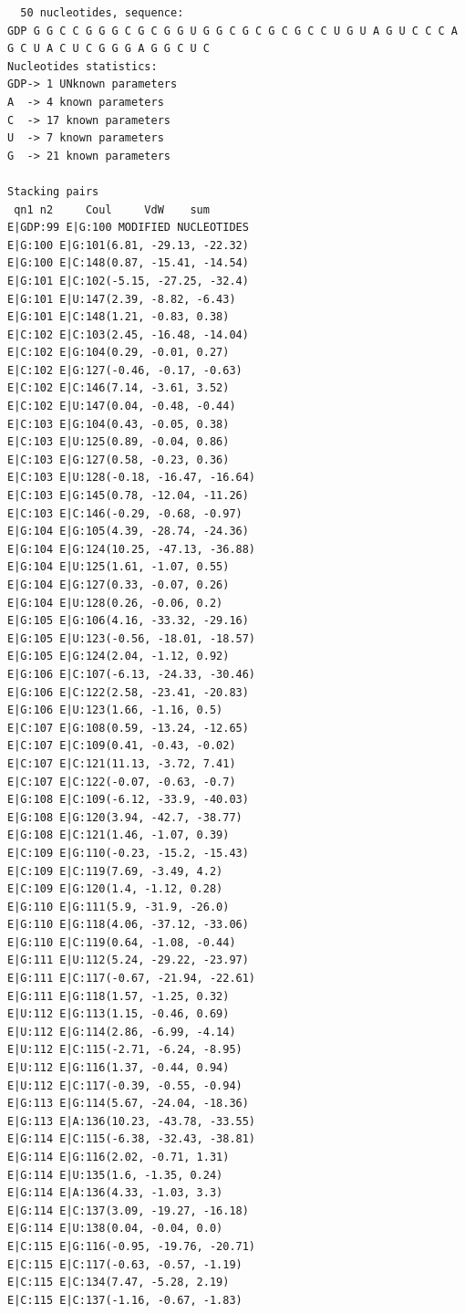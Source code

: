 \documentclass[12pt]{article}
\begin{document}
\begin{appendices}
\begin{scriptsize}
\begin{lstlisting}
  50 nucleotides, sequence: 
GDP G G C C G G G C G C G G U G G C G C G C G C C U G U A G U C C C A G C U A C U C G G G A G G C U C 
Nucleotides statistics:
GDP-> 1 UNknown parameters
A  -> 4 known parameters
C  -> 17 known parameters
U  -> 7 known parameters
G  -> 21 known parameters

Stacking pairs
 qn1 n2     Coul     VdW    sum
E|GDP:99 E|G:100 MODIFIED NUCLEOTIDES
E|G:100 E|G:101(6.81, -29.13, -22.32)
E|G:100 E|C:148(0.87, -15.41, -14.54)
E|G:101 E|C:102(-5.15, -27.25, -32.4)
E|G:101 E|U:147(2.39, -8.82, -6.43)
E|G:101 E|C:148(1.21, -0.83, 0.38)
E|C:102 E|C:103(2.45, -16.48, -14.04)
E|C:102 E|G:104(0.29, -0.01, 0.27)
E|C:102 E|G:127(-0.46, -0.17, -0.63)
E|C:102 E|C:146(7.14, -3.61, 3.52)
E|C:102 E|U:147(0.04, -0.48, -0.44)
E|C:103 E|G:104(0.43, -0.05, 0.38)
E|C:103 E|U:125(0.89, -0.04, 0.86)
E|C:103 E|G:127(0.58, -0.23, 0.36)
E|C:103 E|U:128(-0.18, -16.47, -16.64)
E|C:103 E|G:145(0.78, -12.04, -11.26)
E|C:103 E|C:146(-0.29, -0.68, -0.97)
E|G:104 E|G:105(4.39, -28.74, -24.36)
E|G:104 E|G:124(10.25, -47.13, -36.88)
E|G:104 E|U:125(1.61, -1.07, 0.55)
E|G:104 E|G:127(0.33, -0.07, 0.26)
E|G:104 E|U:128(0.26, -0.06, 0.2)
E|G:105 E|G:106(4.16, -33.32, -29.16)
E|G:105 E|U:123(-0.56, -18.01, -18.57)
E|G:105 E|G:124(2.04, -1.12, 0.92)
E|G:106 E|C:107(-6.13, -24.33, -30.46)
E|G:106 E|C:122(2.58, -23.41, -20.83)
E|G:106 E|U:123(1.66, -1.16, 0.5)
E|C:107 E|G:108(0.59, -13.24, -12.65)
E|C:107 E|C:109(0.41, -0.43, -0.02)
E|C:107 E|C:121(11.13, -3.72, 7.41)
E|C:107 E|C:122(-0.07, -0.63, -0.7)
E|G:108 E|C:109(-6.12, -33.9, -40.03)
E|G:108 E|G:120(3.94, -42.7, -38.77)
E|G:108 E|C:121(1.46, -1.07, 0.39)
E|C:109 E|G:110(-0.23, -15.2, -15.43)
E|C:109 E|C:119(7.69, -3.49, 4.2)
E|C:109 E|G:120(1.4, -1.12, 0.28)
E|G:110 E|G:111(5.9, -31.9, -26.0)
E|G:110 E|G:118(4.06, -37.12, -33.06)
E|G:110 E|C:119(0.64, -1.08, -0.44)
E|G:111 E|U:112(5.24, -29.22, -23.97)
E|G:111 E|C:117(-0.67, -21.94, -22.61)
E|G:111 E|G:118(1.57, -1.25, 0.32)
E|U:112 E|G:113(1.15, -0.46, 0.69)
E|U:112 E|G:114(2.86, -6.99, -4.14)
E|U:112 E|C:115(-2.71, -6.24, -8.95)
E|U:112 E|G:116(1.37, -0.44, 0.94)
E|U:112 E|C:117(-0.39, -0.55, -0.94)
E|G:113 E|G:114(5.67, -24.04, -18.36)
E|G:113 E|A:136(10.23, -43.78, -33.55)
E|G:114 E|C:115(-6.38, -32.43, -38.81)
E|G:114 E|G:116(2.02, -0.71, 1.31)
E|G:114 E|U:135(1.6, -1.35, 0.24)
E|G:114 E|A:136(4.33, -1.03, 3.3)
E|G:114 E|C:137(3.09, -19.27, -16.18)
E|G:114 E|U:138(0.04, -0.04, 0.0)
E|C:115 E|G:116(-0.95, -19.76, -20.71)
E|C:115 E|C:117(-0.63, -0.57, -1.19)
E|C:115 E|C:134(7.47, -5.28, 2.19)
E|C:115 E|C:137(-1.16, -0.67, -1.83)

\end{lstlisting}
\end{scriptsize}
\end{appendices}
\end{document}
